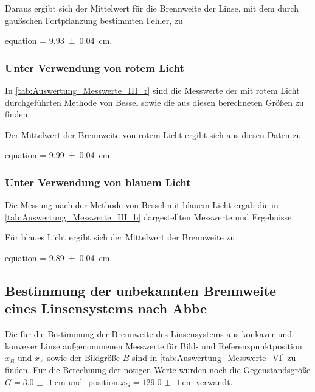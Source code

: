 		
		
		Daraus ergibt sich der Mittelwert für die Brennweite der Linse,
		mit dem durch gaußschen Fortpflanzung bestimmten Fehler,  zu
		\begin{empheq}{equation}
			\label{val:Auswertung_BesselWeis}
			 = \SI{9.93(4)}{\centi\meter}.
		\end{empheq}
		
	\subsubsection{Unter Verwendung von rotem Licht}	
		
		In \cref{tab:Auswertung_Messwerte_III_r} sind die Messwerte der mit rotem
		Licht durchgeführten Methode von Bessel sowie die aus diesen berechneten
		Größen zu finden.
		
		
		
		 Der Mittelwert der Brennweite von rotem Licht ergibt sich aus diesen Daten zu
		\begin{empheq}{equation}
			\label{val:Auswertung_BesselRot}
			 = \SI{9.99(4)}{\centi\meter}.
		\end{empheq}		 
		
	
	\subsubsection{Unter Verwendung von blauem Licht}	
		
		Die Messung nach der Methode von Bessel mit blauem Licht ergab die 
		in \cref{tab:Auswertung_Messwerte_III_b}  dargestellten Messwerte und Ergebnisse.	
		
				
		
		Für blaues Licht ergibt sich der Mittelwert der Brennweite zu
		\begin{empheq}{equation}
			\label{val:Auswertung_BesselBlau}
			 = \SI{9.89(4)}{\centi\meter}.
		\end{empheq}		
		
		

\subsection{Bestimmung der unbekannten Brennweite eines Linsensystems nach Abbe}
	
	Die für die Bestimmung der Brennweite des Linsensystems aus konkaver und konvexer Linse
	aufgenommenen Messwerte für Bild- und Referenzpunktposition $x_{B}$ und $x_{A}$ sowie 
	der Bildgröße $B$ sind in \cref{tab:Auswertung_Messwerte_VI} zu finden. Für die Berechnung der nötigen Werte
	wurden noch die Gegenstandsgröße $G = \SI{3.0(1)}{\centi\meter}$ und 
	-position $x_{G} = \SI{129.0(1)}{\centi\meter}$ verwandt.   
	
